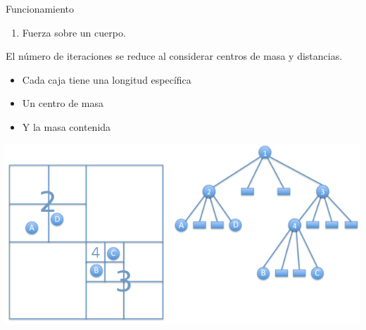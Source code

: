 \documentclass{beamer}
\newcounter{stepsBarnes}
\newcommand{\conti}{\setcounter{enumi}{\value{stepsBarnes}}}
\begin{document}
\begin{frame}{Funcionamiento}
	\begin{enumerate}
		\conti
		\item Fuerza sobre un cuerpo.
	\end{enumerate}
	\small
	El n\'umero de iteraciones se reduce al considerar centros de masa y distancias. \pause
	\begin{itemize}
		\item Cada caja tiene una longitud espec\'ifica \pause
		\item Un centro de masa \pause
		\item Y la masa contenida \pause
	\end{itemize}
	\centering
	\includegraphics[width=0.5\linewidth]{sources/images/quadtree.png}
\end{frame}
\end{document}
